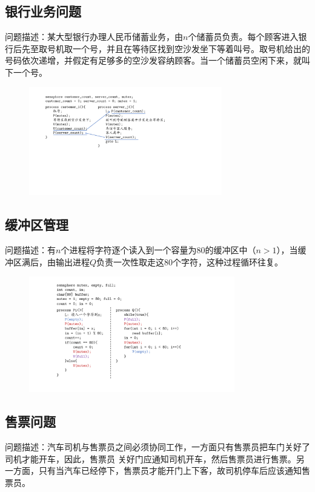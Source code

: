 \documentclass[cs4size,a4paper,10pt]{ctexart}
\begin{document}
	\subsection{银行业务问题}
	问题描述：某大型银行办理人民币储蓄业务，由$n$个储蓄员负责。每个顾客进入银行后先至取号机取一个号，并且在等待区找到空沙发坐下等着叫号。取号机给出的号码依次递增，并假定有足够多的空沙发容纳顾客。当一个储蓄员空闲下来，就叫下一个号。

	\begin{figure}[H]
		\centering
		\includegraphics[width=0.75\textwidth]{img/银行业务问题.pdf}
	\end{figure}

	\subsection{缓冲区管理}
	问题描述：有$n$个进程将字符逐个读入到一个容量为80的缓冲区中（$n>1$），当缓冲区满后，由输出进程$Q$负责一次性取走这80个字符，这种过程循环往复。

	\begin{figure}[H]
		\centering
		\includegraphics[width=0.8\textwidth]{img/缓冲区管理.pdf}
	\end{figure}

	\subsection{售票问题}
	问题描述：汽车司机与售票员之间必须协同工作，一方面只有售票员把车门关好了司机才能开车，因此，售票员 关好门应通知司机开车，然后售票员进行售票。另一方面，只有当汽车已经停下，售票员才能开门上下客，故司机停车后应该通知售票员。
	
\end{document}
